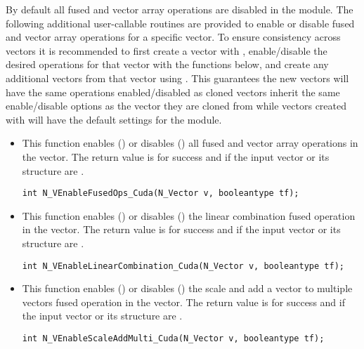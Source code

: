 By default all fused and vector array operations are disabled in the {\nveccuda}
module. The following additional user-callable routines are provided to
enable or disable fused and vector array operations for a specific vector. To
ensure consistency across vectors it is recommended to first create a vector
with , enable/disable the desired operations for that vector
with the functions below, and create any additional vectors from that vector
using . This guarantees the new vectors will have the same
operations enabled/disabled as cloned vectors inherit the same enable/disable
options as the vector they are cloned from while vectors created with
 will have the default settings for the {\nveccuda} module.
\begin{itemize}


\item {}

This function enables () or disables () all fused and
vector array operations in the {\cuda} vector. The return value is  for
success and  if the input vector or its  structure are .

\verb|int N_VEnableFusedOps_Cuda(N_Vector v, booleantype tf);|


\item {}

This function enables () or disables () the linear
combination fused operation in the {\cuda} vector. The return value is  for
success and  if the input vector or its  structure are .

\verb|int N_VEnableLinearCombination_Cuda(N_Vector v, booleantype tf);|


\item {}

This function enables () or disables () the scale and
add a vector to multiple vectors fused operation in the {\cuda} vector. The
return value is  for success and  if the input vector or its
 structure are .

\verb|int N_VEnableScaleAddMulti_Cuda(N_Vector v, booleantype tf);|


\end{itemize}
